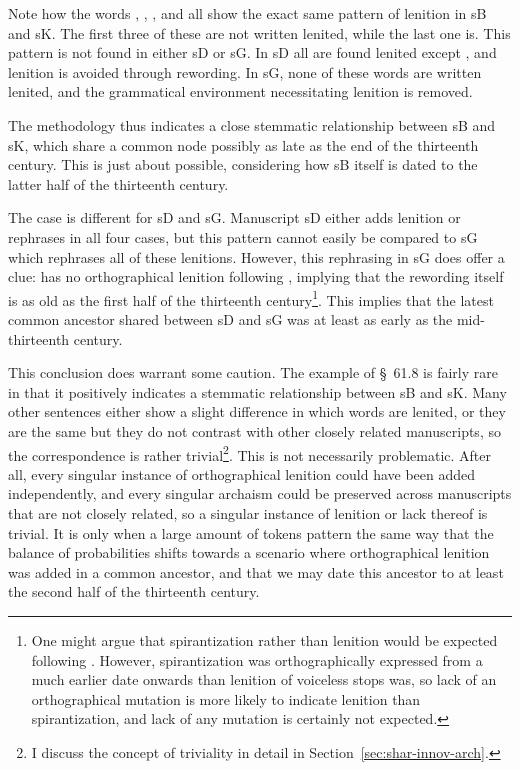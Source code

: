 Note how the words , , , and  all show the exact same pattern of lenition in \gls{sB} and \gls{sK}. The first three of these are not written lenited, while the last one is. This pattern is not found in either \gls{sD} or \gls{sG}. In \gls{sD} all are found lenited except , and lenition is avoided through rewording. In \gls{sG}, none of these words are written lenited, and the grammatical environment necessitating lenition is removed. 

The methodology thus indicates a close stemmatic relationship between \gls{sB} and \gls{sK}, which share a common node possibly as late as the end of the thirteenth century. This is just about possible, considering how \gls{sB} itself is dated to the latter half of the thirteenth century.

The case is different for \gls{sD} and \gls{sG}. Manuscript \gls{sD} either adds lenition or rephrases in all four cases, but this pattern cannot easily be compared to \gls{sG} which rephrases all of these lenitions. However, this rephrasing in \gls{sG} does offer a clue:  has no orthographical lenition following , implying that the rewording itself is as old as the first half of the thirteenth century\footnote{%
  One might argue that spirantization rather than lenition would be expected following . However, spirantization was orthographically expressed from a much earlier date onwards than lenition of voiceless stops was, so lack of an orthographical mutation is more likely to indicate lenition than spirantization, and lack of any mutation is certainly not expected.}.
This implies that the latest common ancestor shared between \gls{sD} and \gls{sG} was at least as early as the mid-thirteenth century.

This conclusion does warrant some caution. The example of §~61.8 is fairly rare in that it positively indicates a stemmatic relationship between \gls{sB} and \gls{sK}. Many other sentences either show a slight difference in which words are lenited, or they are the same but they do not contrast with other closely related manuscripts, so the correspondence is rather trivial\footnote{I discuss the concept of triviality in detail in Section~\ref{sec:shar-innov-arch}.}. This is not necessarily problematic. After all, every singular instance of orthographical lenition could have been added independently, and every singular archaism could be preserved across manuscripts that are not closely related, so a singular instance of lenition or lack thereof is trivial. It is only when a large amount of tokens pattern the same way that the balance of probabilities shifts towards a scenario where orthographical lenition was added in a common ancestor, and that we may date this ancestor to at least the second half of the thirteenth century.


